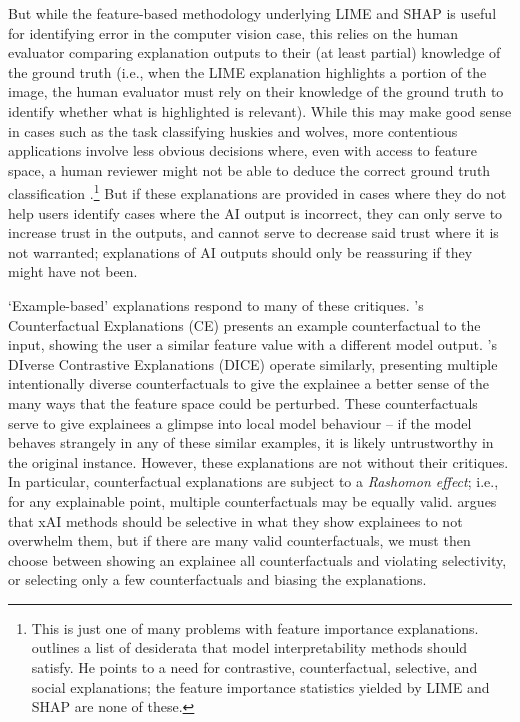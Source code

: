 But while the feature-based methodology underlying LIME and SHAP is useful for identifying error in the computer vision case, this relies on the human evaluator comparing explanation outputs to their (at least partial) knowledge of the ground truth (i.e., when the LIME explanation highlights a portion of the image, the human evaluator must rely on their knowledge of the ground truth to identify whether what is highlighted is relevant). While this may make good sense in cases such as the task classifying huskies and wolves, more contentious applications involve less obvious decisions where, even with access to feature space, a human reviewer might not be able to deduce the correct ground truth classification \cite{kumar_problems_2020,markus_role_2021}.\footnote{This is just one of many problems with feature importance explanations. \textcite{miller_explanation_2017} outlines a list of desiderata that model interpretability methods should satisfy. He points to a need for contrastive, counterfactual, selective, and social explanations; the feature importance statistics yielded by LIME and SHAP are none of these.} But if these explanations are provided in cases where they do not help users identify cases where the AI output is incorrect, they can only serve to increase trust in the outputs, and cannot serve to decrease said trust where it is not warranted; explanations of AI outputs should only be reassuring if they might have not been.

`Example-based' explanations respond to many of these critiques. \textcite{wachter_counterfactual_2017}'s Counterfactual Explanations (CE) presents an example counterfactual to the input, showing the user a similar feature value with a different model output. \textcite{mothilal_explaining_2019}'s DIverse Contrastive Explanations (DICE) operate similarly, presenting multiple intentionally diverse counterfactuals to give the explainee a better sense of the many ways that the feature space could be perturbed. These counterfactuals serve to give explainees a glimpse into local model behaviour – if the model behaves strangely in any of these similar examples, it is likely untrustworthy in the original instance. However, these explanations are not without their critiques. In particular, counterfactual explanations are subject to a \emph{Rashomon effect}; i.e., for any explainable point, multiple counterfactuals may be equally valid. \textcite{miller_explanation_2017} argues that xAI methods should be selective in what they show explainees to not overwhelm them, but if there are many valid counterfactuals, we must then choose between showing an explainee all counterfactuals and violating selectivity, or selecting only a few counterfactuals and biasing the explanations.

